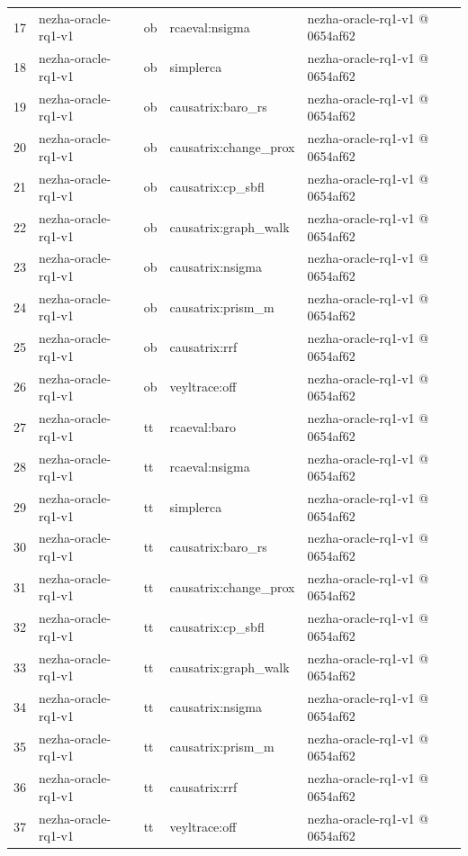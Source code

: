 \begin{longtable}{@{}r>{\raggedright\arraybackslash}p{87.0pt}>{\raggedright\arraybackslash}p{18.0pt}>{\raggedright\arraybackslash}p{63.0pt}>{\raggedright\arraybackslash}p{108.0pt}@{}}
17 & nezha-oracle-rq1-v1 & ob & rcaeval:nsigma & nezha-oracle-rq1-v1 @ 0654af62 \\
18 & nezha-oracle-rq1-v1 & ob & simplerca & nezha-oracle-rq1-v1 @ 0654af62 \\
19 & nezha-oracle-rq1-v1 & ob & causatrix:baro\_rs & nezha-oracle-rq1-v1 @ 0654af62 \\
20 & nezha-oracle-rq1-v1 & ob & causatrix:change\_prox & nezha-oracle-rq1-v1 @ 0654af62 \\
21 & nezha-oracle-rq1-v1 & ob & causatrix:cp\_sbfl & nezha-oracle-rq1-v1 @ 0654af62 \\
22 & nezha-oracle-rq1-v1 & ob & causatrix:graph\_walk & nezha-oracle-rq1-v1 @ 0654af62 \\
23 & nezha-oracle-rq1-v1 & ob & causatrix:nsigma & nezha-oracle-rq1-v1 @ 0654af62 \\
24 & nezha-oracle-rq1-v1 & ob & causatrix:prism\_m & nezha-oracle-rq1-v1 @ 0654af62 \\
25 & nezha-oracle-rq1-v1 & ob & causatrix:rrf & nezha-oracle-rq1-v1 @ 0654af62 \\
26 & nezha-oracle-rq1-v1 & ob & veyltrace:off & nezha-oracle-rq1-v1 @ 0654af62 \\
27 & nezha-oracle-rq1-v1 & tt & rcaeval:baro & nezha-oracle-rq1-v1 @ 0654af62 \\
28 & nezha-oracle-rq1-v1 & tt & rcaeval:nsigma & nezha-oracle-rq1-v1 @ 0654af62 \\
29 & nezha-oracle-rq1-v1 & tt & simplerca & nezha-oracle-rq1-v1 @ 0654af62 \\
30 & nezha-oracle-rq1-v1 & tt & causatrix:baro\_rs & nezha-oracle-rq1-v1 @ 0654af62 \\
31 & nezha-oracle-rq1-v1 & tt & causatrix:change\_prox & nezha-oracle-rq1-v1 @ 0654af62 \\
32 & nezha-oracle-rq1-v1 & tt & causatrix:cp\_sbfl & nezha-oracle-rq1-v1 @ 0654af62 \\
33 & nezha-oracle-rq1-v1 & tt & causatrix:graph\_walk & nezha-oracle-rq1-v1 @ 0654af62 \\
34 & nezha-oracle-rq1-v1 & tt & causatrix:nsigma & nezha-oracle-rq1-v1 @ 0654af62 \\
35 & nezha-oracle-rq1-v1 & tt & causatrix:prism\_m & nezha-oracle-rq1-v1 @ 0654af62 \\
36 & nezha-oracle-rq1-v1 & tt & causatrix:rrf & nezha-oracle-rq1-v1 @ 0654af62 \\
37 & nezha-oracle-rq1-v1 & tt & veyltrace:off & nezha-oracle-rq1-v1 @ 0654af62 \\

\end{longtable}
